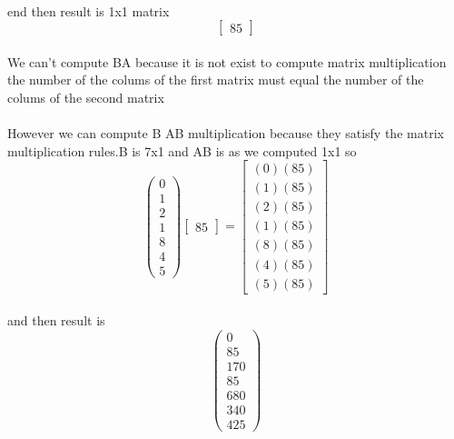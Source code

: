 \documentclass[11pt]{article}
\begin{document}
\paragraph{}end then result is 1x1 matrix
\[
\begin{bmatrix}
85
\end{bmatrix}
\]
\paragraph{}We can't compute BA because it is not exist to compute matrix multiplication the number of the colums of the first matrix must equal the number of the colums of the second matrix
\paragraph{}However we can compute B AB multiplication because they satisfy the matrix multiplication rules.B is 7x1 and AB is as we computed 1x1 so
\[
\begin{pmatrix}
0\\
1\\
2\\
1\\
8\\
4\\
5
\end{pmatrix}
\begin{bmatrix}
85
\end{bmatrix}
=
\begin{bmatrix}
(0)(85)\\
(1)(85)\\
(2)(85)\\
(1)(85)\\
(8)(85)\\
(4)(85)\\
(5)(85)
\end{bmatrix}
\]
\paragraph{}and then result is
\[
\begin{pmatrix}
0\\
85\\
170\\
85\\
680\\
340\\
425
\end{pmatrix}
\]
\end{document}
